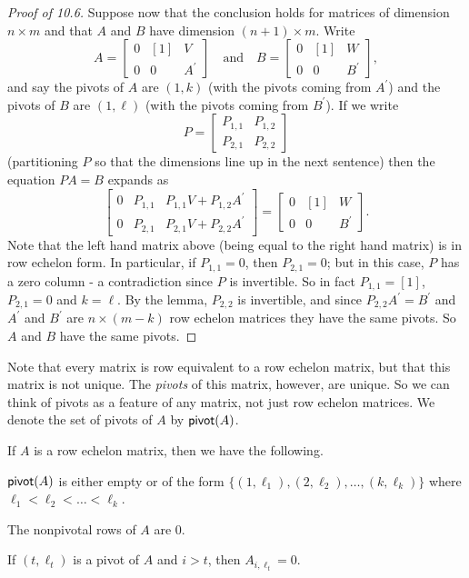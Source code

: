 \documentclass{memoir}
\begin{document}
\begin{proof}[Proof of 10.6]
Suppose now that the conclusion holds for matrices of dimension $n \times m$ and that $A$ and $B$ have dimension $(n+1) \times m$. Write \[ A = \left[ \begin{array}{c|c|c} 0 & [1] & V \\ \hline 0 & 0 & A^\prime \end{array} \right] \quad \mathrm{and} \quad B = \left[ \begin{array}{c|c|c} 0 & [1] & W \\ \hline 0 & 0 & B^\prime \end{array} \right], \] and say the pivots of $A$ are $(1,k)$ (with the pivots coming from $A^\prime$) and the pivots of $B$ are $(1,\ell)$ (with the pivots coming from $B^\prime$). If we write \[ P = \left[ \begin{array}{c|c} P_{1,1} & P_{1,2} \\ \hline P_{2,1} & P_{2,2} \end{array} \right] \] (partitioning $P$ so that the dimensions line up in the next sentence) then the equation $PA = B$ expands as \[ \left[ \begin{array}{c|c|c} 0 & P_{1,1} & P_{1,1}V + P_{1,2}A^\prime \\ \hline 0 & P_{2,1} & P_{2,1}V + P_{2,2} A^\prime \end{array} \right] = \left[ \begin{array}{c|c|c} 0 & [1] & W \\ \hline 0 & 0 & B^\prime \end{array} \right]. \] Note that the left hand matrix above (being equal to the right hand matrix) is in row echelon form. In particular, if $P_{1,1} = 0$, then $P_{2,1} = 0$; but in this case, $P$ has a zero column - a contradiction since $P$ is invertible. So in fact $P_{1,1} = [1]$, $P_{2,1} = 0$ and $k = \ell$. By the lemma, $P_{2,2}$ is invertible, and since $P_{2,2} A^\prime = B^\prime$ and $A^\prime$ and $B^\prime$ are $n \times (m-k)$ row echelon matrices they have the same pivots. So $A$ and $B$ have the same pivots.
\end{proof}

Note that every matrix is row equivalent to a row echelon matrix, but that this matrix is not unique. The \emph{pivots} of this matrix, however, are unique. So we can think of pivots as a feature of any matrix, not just row echelon matrices. We denote the set of pivots of $A$ by $\mathsf{pivot}(A)$.

\begin{prp}
If $A$ is a row echelon matrix, then we have the following.
\begin{enumerate*}
\item $\mathsf{pivot}(A)$ is either empty or of the form $\{(1,\ell_1), (2,\ell_2), \ldots, (k,\ell_k)\}$ where $\ell_1 < \ell_2 < \ldots < \ell_k$.
\item The nonpivotal rows of $A$ are 0.
\item If $(t,\ell_t)$ is a pivot of $A$ and $i > t$, then $A_{i,\ell_t} = 0$.
\end{enumerate*}
\end{prp}
\end{document}
